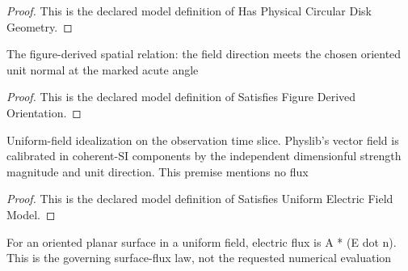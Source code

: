 \begin{proof}
  This is the declared model definition of Has Physical Circular Disk Geometry.
\end{proof}
\begin{definition}
  \label{def:physics:phyx-mini-0998:phyxminiproblems-problemphyxmini0998-satisfiesfigurederivedorientation}
  The figure-derived spatial relation: the field direction meets the chosen oriented unit normal at the marked acute angle
\end{definition}
\begin{proof}
  This is the declared model definition of Satisfies Figure Derived Orientation.
\end{proof}
\begin{definition}
  \label{def:physics:phyx-mini-0998:phyxminiproblems-problemphyxmini0998-satisfiesuniformelectricfieldmodel}
  Uniform-field idealization on the observation time slice. Physlib's vector field is calibrated in coherent-SI components by the independent dimensionful strength magnitude and unit direction. This premise mentions no flux
\end{definition}
\begin{proof}
  This is the declared model definition of Satisfies Uniform Electric Field Model.
\end{proof}
\begin{definition}
  \label{def:physics:phyx-mini-0998:phyxminiproblems-problemphyxmini0998-satisfiesplanarelectricfluxlaw}
  For an oriented planar surface in a uniform field, electric flux is A * (E dot n). This is the governing surface-flux law, not the requested numerical evaluation
\end{definition}
